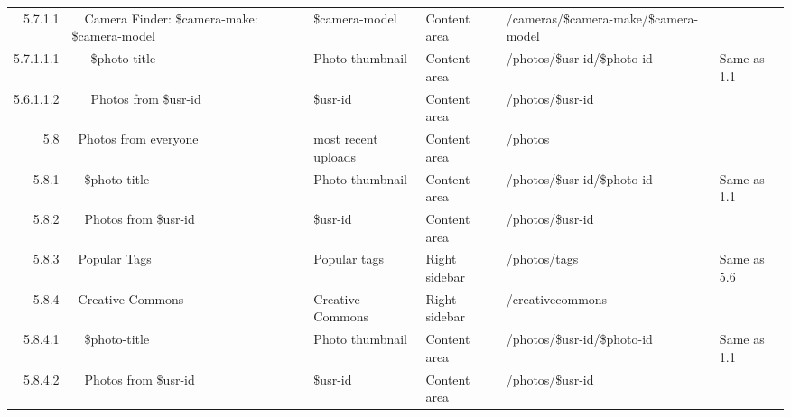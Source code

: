 \documentclass[12pt,a4paper]{article}
\begin{document}
\begin{landscape}
\begin{table}[h!b!p!]
\begin{center}
\begin{tiny}
\begin{tabular}{r|l|l|l|l|p{3cm}}
                  5.7.1.1 &
                  ~~Camera Finder: \$camera-make: \$camera-model &
                  \$camera-model &
                  Content area &
                  /cameras/\$camera-make/\$camera-model &
                  \\

                    5.7.1.1.1 &
                    ~~~\$photo-title &
                    Photo thumbnail &
                    Content area &
                    /photos/\$usr-id/\$photo-id &
                    Same as 1.1 \\

                    5.6.1.1.2 &
                    ~~~Photos from \$usr-id &
                    \$usr-id &
                    Content area &
                    /photos/\$usr-id &
                    \\

              5.8 &
              ~Photos from everyone &
              most recent uploads &
              Content area &
              /photos &
              \\

                  5.8.1 &
                  ~~\$photo-title &
                  Photo thumbnail &
                  Content area &
                  /photos/\$usr-id/\$photo-id &
                  Same as 1.1 \\

                  5.8.2 &
                  ~~Photos from \$usr-id &
                  \$usr-id &
                  Content area &
                  /photos/\$usr-id &
                  \\


                  5.8.3 &
                  ~Popular Tags &
                  Popular tags &
                  Right sidebar &
                  /photos/tags &
                  Same as 5.6 \\

                  5.8.4 &
                  ~Creative Commons &
                  Creative Commons &
                  Right sidebar &
                  /creativecommons &
                  \\

                    5.8.4.1 &
                    ~~\$photo-title &
                    Photo thumbnail &
                    Content area &
                    /photos/\$usr-id/\$photo-id &
                    Same as 1.1 \\

                    5.8.4.2 &
                    ~~Photos from \$usr-id &
                    \$usr-id &
                    Content area &
                    /photos/\$usr-id &
                    \\


\end{tabular}
\end{tiny}
\end{center}
\end{table}
\end{landscape}
\end{document}
